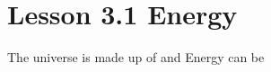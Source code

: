 \documentclass[12pt, answers]{exam}
\begin{document}
\section*{Lesson 3.1 Energy}

\begin{questions}
    \question The universe is made up of \fillin[matter] and \fillin[energy]
    \question Energy can be \fillin[answer]


\end{questions}

    
\end{document}
